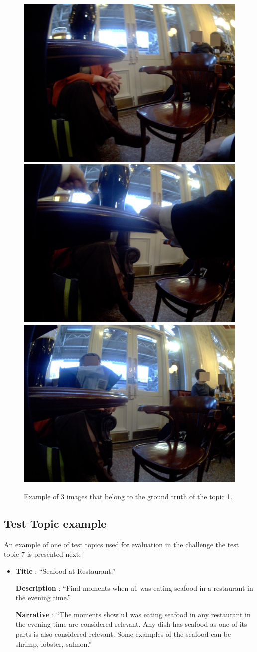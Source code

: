     \begin{figure}[H]
        \centering
        \captionsetup{justification=centering}
        \includegraphics[width=.3\linewidth]{Sections/5ImageClef/images/example.jpg}
        \includegraphics[width=.3\linewidth]{Sections/5ImageClef/images/example1.jpg}
        \includegraphics[width=.3\linewidth]{Sections/5ImageClef/images/example3.jpg}
        \caption[Ground truth images]{Example of 3 images that belong to the ground truth of the topic 1.}
        \label{fig:gt_images}
    \end{figure}      

    \newpage


    \subsection{Test Topic example}

    An example of one of test topics used for evaluation in the challenge the test topic 7 is presented next:

        \begin{itemize}

        \item []
        

        \textbf{Title} : \enquote{Seafood at Restaurant.}

        \textbf{Description} : \enquote{Find moments when u1 was eating seafood in a restaurant in the evening time.}

        \textbf{Narrative} : \enquote{The moments show u1 was eating seafood in any restaurant in the evening time are considered relevant. Any dish has seafood as one of its parts is also considered relevant. Some examples of the seafood can be shrimp, lobster, salmon.}

        \end{itemize}
     
